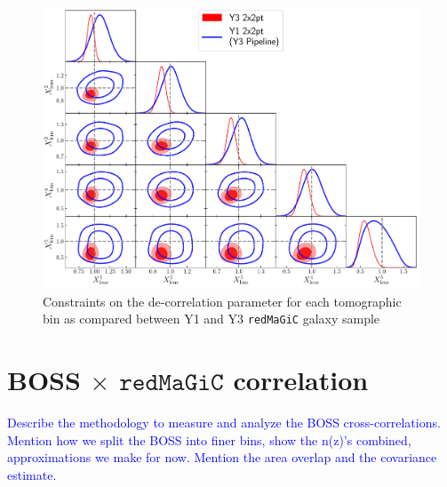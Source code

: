 \documentclass[fleqn,usenatbib]{mnras}
\newcommand{\redmagic}{\texttt{redMaGiC} }
\newcommand{\blue}[1]{\textcolor{blue}{#1}}
\begin{document}
\begin{figure}
\includegraphics[width=\columnwidth]{figs/Xlens_5_y1_y3_comp.pdf}
\caption[]{Constraints on the de-correlation parameter for each tomographic bin as compared between Y1 and Y3 \redmagic galaxy sample}
\label{fig:pm_evolve}
\end{figure}

\section{BOSS $\times$ $\redmagic$ correlation}
\label{app:bossxrm}
\blue{Describe the methodology to measure and analyze the BOSS cross-correlations. Mention how we split the BOSS into finer bins, show the n(z)'s combined, approximations we make for now. Mention the area overlap and the covariance estimate.}
\end{document}
